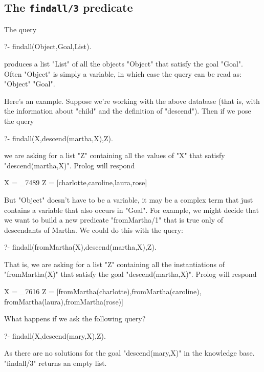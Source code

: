 \subsection*{The {\tt findall/3} predicate}\label{SUBSEC.L11.FINDALL}


The query  
\begin{LPNcodedisplay}
?- findall(Object,Goal,List).
\end{LPNcodedisplay}
produces a list "List" of all the objects "Object" that
satisfy the goal "Goal".  Often "Object" is simply a
variable, in which case the query can be read as:  "Object" 
"Goal".

Here's an example.  Suppose we're working with the above
database (that is, with the information about "child" and the
definition of "descend").  Then if we pose the query
\begin{LPNcodedisplay}
?- findall(X,descend(martha,X),Z).
\end{LPNcodedisplay}
we are asking for a list "Z" containing all the values of "X"
that satisfy "descend(martha,X)". Prolog will respond
\begin{LPNcodedisplay}
X = _7489
Z = [charlotte,caroline,laura,rose]
\end{LPNcodedisplay}


But "Object" doesn't have to be a variable, it may be a complex term
that just contains
a variable that also occurs in "Goal".  For example, we might decide that
we want to build a new predicate "fromMartha/1" that is true only
of descendants of Martha.  We could do this with the query:
\begin{LPNcodedisplay}
?- findall(fromMartha(X),descend(martha,X),Z).
\end{LPNcodedisplay}
That is, we are asking for a list "Z" containing all the instantiations of
"fromMartha(X)" that satisfy the goal "descend(martha,X)".
Prolog will respond
\begin{LPNcodedisplay}
X = _7616
Z = [fromMartha(charlotte),fromMartha(caroline),
                 fromMartha(laura),fromMartha(rose)]
\end{LPNcodedisplay}


What happens if we ask the following query?
\begin{LPNcodedisplay}
?- findall(X,descend(mary,X),Z).
\end{LPNcodedisplay}
As there are no solutions for the goal "descend(mary,X)" in the
knowledge base.  "findall/3" returns an empty list.

